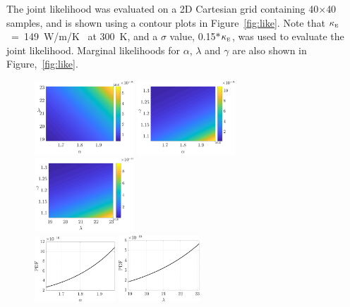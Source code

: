 The joint likelihood was evaluated on a 2D Cartesian grid containing 40$\times$40 samples, and is shown
using a contour plots in Figure~\ref{fig:like}. Note that 
$\kappa_{\tiny{\mbox{E}}}$~=~149~W/m/K~\cite{Shanks:1963} at 300~K, and a $\sigma$ value, 
0.15$\ast$$\kappa_{\tiny{\mbox{E}}}$, was used to evaluate the joint likelihood.
Marginal likelihoods for  $\alpha$, $\lambda$ and $\gamma$ are also
shown in Figure,~\ref{fig:like}. 
%
\begin{figure}[htbp]
 \begin{center}
  \includegraphics[width=0.33\textwidth]{./Figures/gl_al}
  \includegraphics[width=0.33\textwidth]{./Figures/gl_ag}
  \includegraphics[width=0.33\textwidth]{./Figures/gl_lg}
  \\
  \includegraphics[width=0.27\textwidth]{./Figures/pdf_alpha}
  \includegraphics[width=0.27\textwidth]{./Figures/pdf_lambda}

\end{center}
\end{figure}$$
